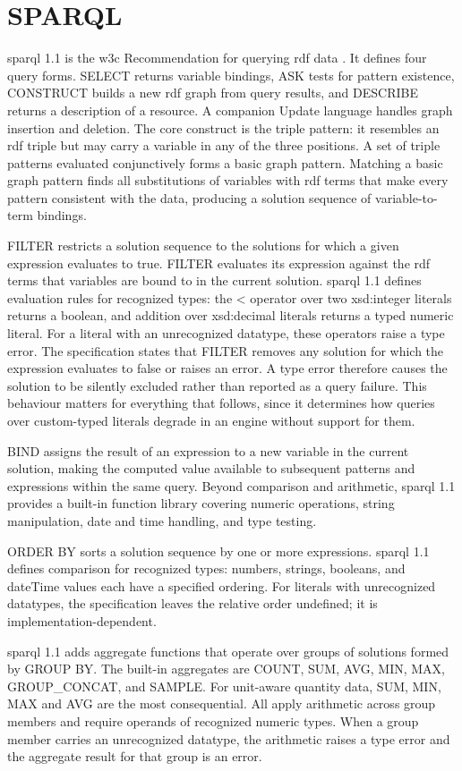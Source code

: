 \section{SPARQL}

\ac{sparql} 1.1 is the \ac{w3c} Recommendation for querying \ac{rdf} data \cite{harris2013sparql}. It defines four query forms. SELECT returns variable bindings, ASK tests for pattern existence, CONSTRUCT builds a new \ac{rdf} graph from query results, and DESCRIBE returns a description of a resource. A companion Update language handles graph insertion and deletion. The core construct is the triple pattern: it resembles an \ac{rdf} triple but may carry a variable in any of the three positions. A set of triple patterns evaluated conjunctively forms a basic graph pattern. Matching a basic graph pattern finds all substitutions of variables with \ac{rdf} terms that make every pattern consistent with the data, producing a solution sequence of variable-to-term bindings.

FILTER restricts a solution sequence to the solutions for which a given expression evaluates to true. FILTER evaluates its expression against the \ac{rdf} terms that variables are bound to in the current solution. \ac{sparql} 1.1 defines evaluation rules for recognized types: the < operator over two \textsf{xsd:integer} literals returns a boolean, and addition over \textsf{xsd:decimal} literals returns a typed numeric literal. For a literal with an unrecognized datatype, these operators raise a type error. The specification states that FILTER removes any solution for which the expression evaluates to false or raises an error. A type error therefore causes the solution to be silently excluded rather than reported as a query failure. This behaviour matters for everything that follows, since it determines how queries over custom-typed literals degrade in an engine without support for them.

BIND assigns the result of an expression to a new variable in the current solution, making the computed value available to subsequent patterns and expressions within the same query. Beyond comparison and arithmetic, \ac{sparql} 1.1 provides a built-in function library covering numeric operations, string manipulation, date and time handling, and type testing.

ORDER BY sorts a solution sequence by one or more expressions. \ac{sparql} 1.1 defines comparison for recognized types: numbers, strings, booleans, and dateTime values each have a specified ordering. For literals with unrecognized datatypes, the specification leaves the relative order undefined; it is implementation-dependent.

\ac{sparql} 1.1 adds aggregate functions that operate over groups of solutions formed by GROUP BY. The built-in aggregates are COUNT, SUM, AVG, MIN, MAX, GROUP\_CONCAT, and SAMPLE. For unit-aware quantity data, SUM, MIN, MAX and AVG are the most consequential. All apply arithmetic across group members and require operands of recognized numeric types. When a group member carries an unrecognized datatype, the arithmetic raises a type error and the aggregate result for that group is an error.